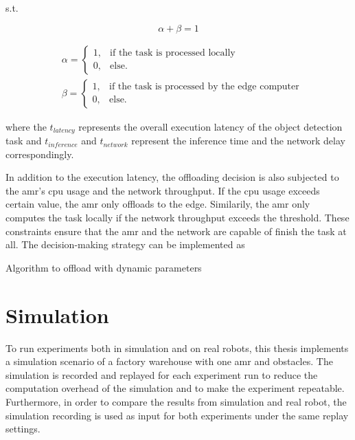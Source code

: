s.t.

\begin{equation*}
    \alpha + \beta = 1
\end{equation*}

\begin{align*}
    & \alpha = \begin{cases}
        1, & \text{if the task is processed locally} \\
        0, & \text{else.}
    \end{cases} \\
    & \beta = \begin{cases}
        1, & \text{if the task is processed by the edge computer} \\
        0, & \text{else.}
    \end{cases}
\end{align*}

where the $t_{latency}$ represents the overall execution latency of the object detection task and $t_{inference}$ and $t_{network}$ represent the inference time and the network delay correspondingly. 

In addition to the execution latency, the offloading decision is also subjected to the \gls{amr}'s \gls{cpu} usage and the network throughput. If the \gls{cpu} usage exceeds certain value, the \gls{amr} only offloads to the edge. Similarily, the \gls{amr} only computes the task locally if the network throughput exceeds the threshold. These constraints ensure that the \gls{amr} and the network are capable of finish the task at all. The decision-making strategy can be implemented as 

\begin{algorithm}[htp]
\caption{Algorithm to offload with dynamic parameters}\label{alg:decision_making_strategy}
\begin{algorithmic}[1]
    \EndFunction
\end{algorithmic}
\end{algorithm}



\section{Simulation}\label{sec:general_setup:simulation}

To run experiments both in simulation and on real robots, this thesis implements a simulation scenario of a factory warehouse with one \gls{amr} and obstacles. The simulation is recorded and replayed for each experiment run to reduce the computation overhead of the simulation and to make the experiment repeatable. Furthermore, in order to compare the results from simulation and real robot, the simulation recording is used as input for both experiments under the same replay settings. 

